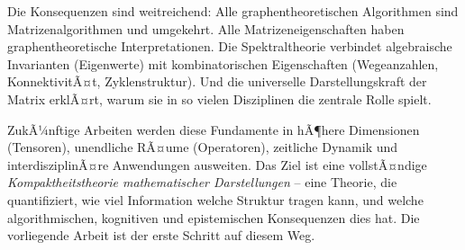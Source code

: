 ﻿\documentclass[12pt, a4paper]{article}
\theoremstyle{definition}
\theoremstyle{remark}
\begin{document}
Die Konsequenzen sind weitreichend: Alle graphentheoretischen Algorithmen
sind Matrizenalgorithmen und umgekehrt. Alle Matrizeneigenschaften haben
graphentheoretische Interpretationen. Die Spektraltheorie verbindet
algebraische Invarianten (Eigenwerte) mit kombinatorischen Eigenschaften
(Wegeanzahlen, KonnektivitÃ¤t, Zyklenstruktur). Und die universelle
Darstellungskraft der Matrix erklÃ¤rt, warum sie in so vielen Disziplinen
die zentrale Rolle spielt.

ZukÃ¼nftige Arbeiten werden diese Fundamente in hÃ¶here Dimensionen
(Tensoren), unendliche RÃ¤ume (Operatoren), zeitliche Dynamik und
interdisziplinÃ¤re Anwendungen ausweiten. Das Ziel ist eine vollstÃ¤ndige
\emph{Kompaktheitstheorie mathematischer Darstellungen} -- eine Theorie,
die quantifiziert, wie viel Information welche Struktur tragen kann, und
welche algorithmischen, kognitiven und epistemischen Konsequenzen dies
hat. Die vorliegende Arbeit ist der erste Schritt auf diesem Weg.
\end{document}
